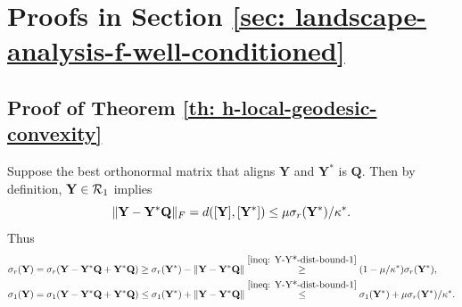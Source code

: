 \documentclass[11pt]{article}
\newcommand{\0}{{\mathbf{0}}}
\newcommand{\1}{{\mathbf{1}}}
\newcommand{\Q}{{\mathbf{Q}}}
\newcommand{\Y}{{\mathbf{Y}}}
\newcommand{\cR}{{\cal R}}
\newcommand{\F}{{\rm F}}
\begin{document}
\appendix



\section{Proofs in Section \ref{sec: landscape-analysis-f-well-conditioned}} \label{sec: proof-landscape-h-f-well-condition}

\subsection{Proof of Theorem \ref{th: h-local-geodesic-convexity} }
Suppose the best orthonormal matrix that aligns $\Y$ and $\Y^*$ is $\Q$. Then by definition, $\Y \in \cR_1$ implies %
\begin{equation} \label{ineq: Y-Y*-dist-bound-1}
	\| \Y - \Y^* \Q \|_\F =  d([\Y],[\Y^*]) \leq \mu  \sigma_r(\Y^*)/\kappa^*.  
\end{equation}
Thus 
\begin{equation} \label{ineq: spectrum-bound-of-Y1}
	\begin{split}
		\sigma_r(\Y) &= \sigma_r(\Y - \Y^* \Q + \Y^* \Q ) \geq \sigma_r(\Y^*) - \|\Y - \Y^* \Q\|  \overset{ \eqref{ineq: Y-Y*-dist-bound-1} } \geq (1 - \mu/ \kappa^* ) \sigma_r(\Y^*),\\
		\sigma_1(\Y) &= \sigma_1(\Y - \Y^* \Q + \Y^* \Q  ) \leq \sigma_1(\Y^*) + \|\Y - \Y^* \Q\| \overset{ \eqref{ineq: Y-Y*-dist-bound-1} } \leq \sigma_1(\Y^*) +  \mu \sigma_r(\Y^*)/ \kappa^*.
	\end{split}
\end{equation}
\end{document}
